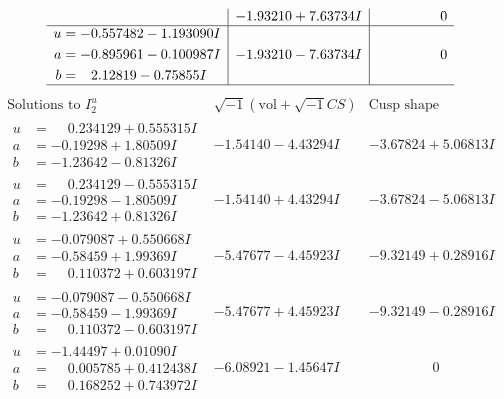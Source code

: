 \documentclass[1p]{elsarticle_modified}
\theoremstyle{definition}
\newcommand{\I}{\sqrt{-1}}
\begin{document}
$$\begin{array}{c|c|c}
 & -1.93210 + 7.63734 I & \phantom{-0.000000 } 0 \\ \hline\begin{aligned}
u &= -0.557482 - 1.193090 I \\
a &= -0.895961 - 0.100987 I \\
b &= \phantom{-}2.12819 - 0.75855 I\end{aligned}
 & -1.93210 - 7.63734 I & \phantom{-0.000000 } 0\\
 \hline 
 \end{array}$$\newpage$$\begin{array}{c|c|c}  
\text{Solutions to }I^u_{2}& \I (\text{vol} + \sqrt{-1}CS) & \text{Cusp shape}\\
 \hline 
\begin{aligned}
u &= \phantom{-}0.234129 + 0.555315 I \\
a &= -0.19298 + 1.80509 I \\
b &= -1.23642 - 0.81326 I\end{aligned}
 & -1.54140 - 4.43294 I & -3.67824 + 5.06813 I \\ \hline\begin{aligned}
u &= \phantom{-}0.234129 - 0.555315 I \\
a &= -0.19298 - 1.80509 I \\
b &= -1.23642 + 0.81326 I\end{aligned}
 & -1.54140 + 4.43294 I & -3.67824 - 5.06813 I \\ \hline\begin{aligned}
u &= -0.079087 + 0.550668 I \\
a &= -0.58459 + 1.99369 I \\
b &= \phantom{-}0.110372 + 0.603197 I\end{aligned}
 & -5.47677 - 4.45923 I & -9.32149 + 0.28916 I \\ \hline\begin{aligned}
u &= -0.079087 - 0.550668 I \\
a &= -0.58459 - 1.99369 I \\
b &= \phantom{-}0.110372 - 0.603197 I\end{aligned}
 & -5.47677 + 4.45923 I & -9.32149 - 0.28916 I \\ \hline\begin{aligned}
u &= -1.44497 + 0.01090 I \\
a &= \phantom{-}0.005785 + 0.412438 I \\
b &= \phantom{-}0.168252 + 0.743972 I\end{aligned}
 & -6.08921 - 1.45647 I & \phantom{-0.000000 } 0 \\ \hline\begin{aligned}

\end{aligned}
\end{array}$$
\end{document}
